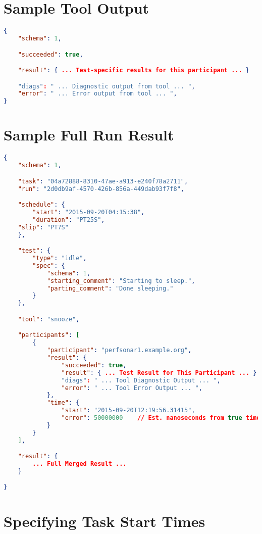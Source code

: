 \documentclass[10pt]{article}
\begin{document}
\section{Sample Tool Output}

\begin{lstlisting}[language=json,firstnumber=1]
{
    "schema": 1,

    "succeeded": true,

    "result": { ... Test-specific results for this participant ... }

    "diags": " ... Diagnostic output from tool ... ",
    "error": " ... Error output from tool ... ",
}

\end{lstlisting}




\section{Sample Full Run Result}

\begin{lstlisting}[language=json,firstnumber=1]
{
    "schema": 1,

    "task": "04a72888-8310-47ae-a913-e240f78a2711",
    "run": "2d0db9af-4570-426b-856a-449dab93f7f8",

    "schedule": {
        "start": "2015-09-20T04:15:38",
        "duration": "PT25S",
	"slip": "PT7S"
    },

    "test": {
        "type": "idle",
        "spec": {
            "schema": 1,
            "starting_comment": "Starting to sleep.",
            "parting_comment": "Done sleeping."
        }
    },

    "tool": "snooze",

    "participants": [
        {
            "participant": "perfsonar1.example.org",
            "result": {
                "succeeded": true,
                "result": { ... Test Result for This Participant ... }
                "diags": " ... Tool Diagnostic Output ... ",
                "error": " ... Tool Error Output ... ",
            },
            "time": {
                "start": "2015-09-20T12:19:56.31415",
                "error": 50000000    // Est. nanoseconds from true time
            }
        }
    ],

    "result": {
        ... Full Merged Result ...
    }

}
\end{lstlisting}


\section{Specifying Task Start Times}
\end{document}
